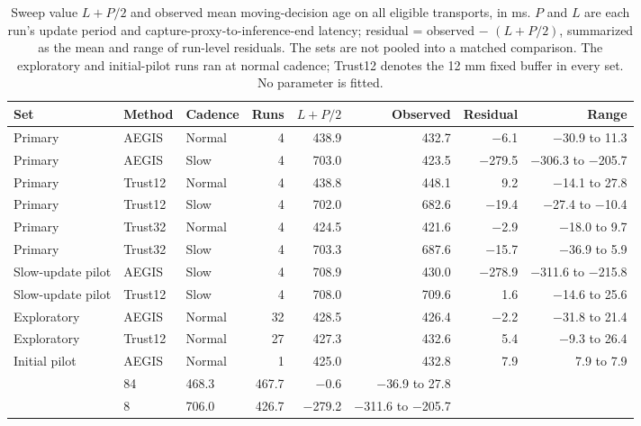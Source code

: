 \begin{table}[H]\centering\small
\caption{Sweep value $L+P/2$ and observed mean moving-decision age on all eligible transports, in ms. $P$ and $L$ are each run's update period and capture-proxy-to-inference-end latency; residual = observed $-$ $(L+P/2)$, summarized as the mean and range of run-level residuals. The sets are not pooled into a matched comparison. The exploratory and initial-pilot runs ran at normal cadence; Trust12 denotes the 12 mm fixed buffer in every set. No parameter is fitted.}\label{tab:age-sweep-all}
\begin{tabularx}{\linewidth}{>{\raggedright\arraybackslash}Xllrrrrr}
\toprule Set & Method & Cadence & Runs & $L+P/2$ & Observed & Residual & Range\\ \midrule
Primary & AEGIS & Normal & 4 & 438.9 & 432.7 & $-$6.1 & $-$30.9 to 11.3\\
Primary & AEGIS & Slow & 4 & 703.0 & 423.5 & $-$279.5 & $-$306.3 to $-$205.7\\
Primary & Trust12 & Normal & 4 & 438.8 & 448.1 & 9.2 & $-$14.1 to 27.8\\
Primary & Trust12 & Slow & 4 & 702.0 & 682.6 & $-$19.4 & $-$27.4 to $-$10.4\\
Primary & Trust32 & Normal & 4 & 424.5 & 421.6 & $-$2.9 & $-$18.0 to 9.7\\
Primary & Trust32 & Slow & 4 & 703.3 & 687.6 & $-$15.7 & $-$36.9 to 5.9\\
Slow-update pilot & AEGIS & Slow & 4 & 708.9 & 430.0 & $-$278.9 & $-$311.6 to $-$215.8\\
Slow-update pilot & Trust12 & Slow & 4 & 708.0 & 709.6 & 1.6 & $-$14.6 to 25.6\\
Exploratory & AEGIS & Normal & 32 & 428.5 & 426.4 & $-$2.2 & $-$31.8 to 21.4\\
Exploratory & Trust12 & Normal & 27 & 427.3 & 432.6 & 5.4 & $-$9.3 to 26.4\\
Initial pilot & AEGIS & Normal & 1 & 425.0 & 432.8 & 7.9 & 7.9 to 7.9\\
\midrule
\multicolumn{3}{l}{Fixed buffers, and AEGIS at normal cadence} & 84 & 468.3 & 467.7 & $-$0.6 & $-$36.9 to 27.8\\
\multicolumn{3}{l}{AEGIS at slow cadence} & 8 & 706.0 & 426.7 & $-$279.2 & $-$311.6 to $-$205.7\\
\bottomrule
\end{tabularx}
\end{table}

